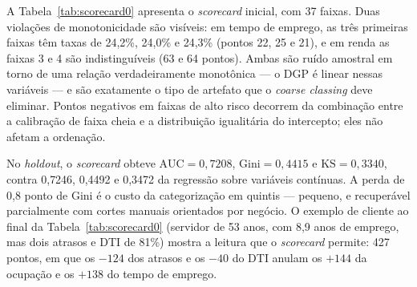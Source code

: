 \documentclass[11pt,a4paper]{article}
\newcommand{\auc}{\mathrm{AUC}}
\newcommand{\ks}{\mathrm{KS}}
\begin{document}
A Tabela~\ref{tab:scorecard0} apresenta o \emph{scorecard} inicial, com 37 faixas. Duas violações de monotonicidade são visíveis: em tempo de emprego, as três primeiras faixas têm taxas de 24{,}2\%, 24{,}0\% e 24{,}3\% (pontos 22, 25 e 21), e em renda as faixas 3 e 4 são indistinguíveis (63 e 64 pontos). Ambas são ruído amostral em torno de uma relação verdadeiramente monotônica --- o DGP é linear nessas variáveis --- e são exatamente o tipo de artefato que o \emph{coarse classing} deve eliminar. Pontos negativos em faixas de alto risco decorrem da combinação entre a calibração de faixa cheia e a distribuição igualitária do intercepto; eles não afetam a ordenação.

No \emph{holdout}, o \emph{scorecard} obteve $\auc=0{,}7208$, $\mathrm{Gini}=0{,}4415$ e $\ks=0{,}3340$, contra 0{,}7246, 0{,}4492 e 0{,}3472 da regressão sobre variáveis contínuas. A perda de 0{,}8 ponto de Gini é o custo da categorização em quintis --- pequeno, e recuperável parcialmente com cortes manuais orientados por negócio. O exemplo de cliente ao final da Tabela~\ref{tab:scorecard0} (servidor de 53 anos, com 8{,}9 anos de emprego, mas dois atrasos e DTI de 81\%) mostra a leitura que o \emph{scorecard} permite: 427 pontos, em que os $-124$ dos atrasos e os $-40$ do DTI anulam os $+144$ da ocupação e os $+138$ do tempo de emprego.
\end{document}
